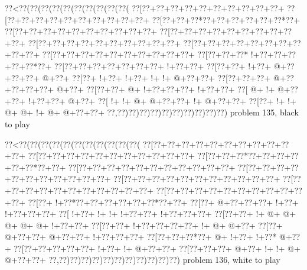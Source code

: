 \vbox{\vbox{\goo
\0??<\0??(\0??(\0??(\0??(\0??(\0??(\0??(\0??(\0??(\0??(
\0??[\0??+\0??+\0??+\0??+\0??+\0??+\0??+\0??+\0??+\0??+
\0??[\0??+\0??+\0??+\0??+\0??+\0??+\0??+\0??+\0??+\0??+
\0??[\0??+\0??+\0??*\0??+\0??+\0??+\0??+\0??+\0??*\0??+
\0??[\0??+\0??+\0??+\0??+\0??+\0??+\0??+\0??+\0??+\0??+
\0??[\0??+\0??+\0??+\0??+\0??+\0??+\0??+\0??+\0??+\0??+
\0??[\0??+\0??+\0??+\0??+\0??+\0??+\0??+\0??+\0??+\0??+
\0??[\0??+\0??+\0??+\0??+\0??+\0??+\0??+\0??+\0??+\0??+
\0??[\0??+\0??+\0??+\0??+\0??+\0??+\0??+\0??+\0??+\0??+
\0??[\0??+\0??+\0??*\- !+\0??+\0??+\0??+\0??+\0??*\0??+
\0??[\0??+\0??+\0??+\0??+\0??+\0??+\0??+\- !+\0??+\0??+
\0??[\0??+\0??+\- !+\0??+\- @+\0??+\0??+\0??+\- @+\0??+
\0??[\0??+\- !+\0??+\- !+\0??+\- !+\- !+\- @+\0??+\0??+
\0??[\0??+\0??+\0??+\- @+\0??+\0??+\0??+\0??+\- @+\0??+
\0??[\0??+\0??+\- @+\- !+\0??+\0??+\0??+\- !+\0??+\0??+
\0??[\- @+\- !+\- @+\0??+\0??+\- !+\0??+\0??+\- @+\0??+
\0??[\- !+\- !+\- @+\- @+\0??+\0??+\- !+\- @+\0??+\0??+
\0??[\0??+\- !+\- !+\- @+\- @+\- !+\- @+\- @+\0??+\0??+
\0??,\0??)\0??)\0??)\0??)\0??)\0??)\0??)\0??)\0??)\0??)
}
\hfil problem 135, black to play\hfil\break
}

\vbox{\vbox{\goo
\0??<\0??(\0??(\0??(\0??(\0??(\0??(\0??(\0??(\0??(\0??(\0??(
\0??[\0??+\0??+\0??+\0??+\0??+\0??+\0??+\0??+\0??+\0??+\0??+
\0??[\0??+\0??+\0??+\0??+\0??+\0??+\0??+\0??+\0??+\0??+\0??+
\0??[\0??+\0??+\0??*\0??+\0??+\0??+\0??+\0??+\0??*\0??+\0??+
\0??[\0??+\0??+\0??+\0??+\0??+\0??+\0??+\0??+\0??+\0??+\0??+
\0??[\0??+\0??+\0??+\0??+\0??+\0??+\0??+\0??+\0??+\0??+\0??+
\0??[\0??+\0??+\0??+\0??+\0??+\0??+\0??+\0??+\0??+\0??+\0??+
\0??[\0??+\0??+\0??+\0??+\0??+\0??+\0??+\0??+\0??+\0??+\0??+
\0??[\0??+\0??+\0??+\0??+\0??+\0??+\0??+\0??+\0??+\0??+\0??+
\0??[\0??+\- !+\0??*\0??+\0??+\0??+\0??+\0??+\0??*\0??+\0??+
\0??[\0??+\- @+\0??+\0??+\0??+\- !+\0??+\- !+\0??+\0??+\0??+
\0??[\- !+\0??+\- !+\- !+\- !+\0??+\0??+\- !+\0??+\0??+\0??+
\0??[\0??+\0??+\- !+\- @+\- @+\- @+\- @+\- @+\- !+\0??+\0??+
\0??[\0??+\0??+\- !+\0??+\0??+\0??+\0??+\- !+\- @+\- @+\0??+
\0??[\0??+\- @+\0??+\0??+\- @+\0??+\0??+\- !+\0??+\0??+\0??+
\0??[\0??+\0??+\0??*\0??+\- @+\- !+\0??+\- !+\0??*\- @+\0??+
\0??[\0??+\0??+\0??+\0??+\0??+\- !+\0??+\- !+\- @+\0??+\0??+
\0??[\0??+\0??+\0??+\- @+\0??+\- !+\- !+\- @+\- @+\0??+\0??+
\0??,\0??)\0??)\0??)\0??)\0??)\0??)\0??)\0??)\0??)\0??)\0??)
}
\hfil problem 136, white to play\hfil\break
}

